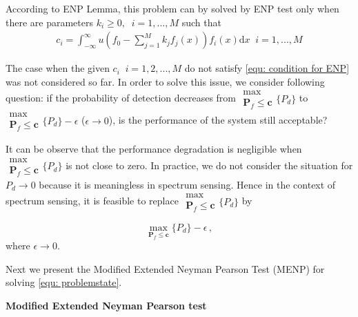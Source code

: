 \documentclass[12pt,journal,a4paper,twoside,onecolumn]{IEEEtran}
\begin{document}
\begin{spacing}{2.5}
According to ENP Lemma, this problem can by solved by ENP test only when there are parameters $k_i \geq 0, \;\;i=1, ..., M$ such that 
\begin{equation}
\label{equ: condition for ENP}
\begin{split}
c_i = \int_{-\infty}^{\infty}u(f_0 - \sum_{j=1}^{M}k_jf_j(x))f_i(x)\mathrm{d}x \;\;i = 1, ..., M
\end{split}
\end{equation}

The case when the given $c_i\;\;i = 1, 2, ..., M$ do not satisfy \eqref{equ: condition for ENP} was not considered so far. 
In order to solve this issue, we consider following question: if the probability of detection decreases from $\substack{\max \\ \mathbf{P}_f \leq \mathbf{c}}\{P_d\}$ to $\substack{\max \\ \mathbf{P}_f \leq \mathbf{c}}\{P_d\} - \epsilon$ ($\epsilon \rightarrow 0$), is the performance of the system still acceptable? 

It can be observe that the performance degradation is negligible when $\substack{\max \\ \mathbf{P}_f \leq \mathbf{c}}\{P_d\}$ is not close to zero. In practice, we do not consider the situation for $P_d \rightarrow 0$ because it is meaningless in spectrum sensing. Hence in the context of spectrum sensing, it is feasible to replace $\substack{\max \\ \mathbf{P}_f \leq \mathbf{c}}\{P_d\}$ by  

\begin{equation}
\label{equ: problemstate}
\max_{\mathbf{P}_{f} \leq \mathbf{c}}\{P_d\} - \epsilon\,,
\end{equation}
where  $\epsilon \rightarrow 0$. 

Next we present the Modified Extended Neyman Pearson Test (MENP) for solving \eqref{equ: problemstate}.

\noindent \textbf{Modified Extended Neyman Pearson test}


\end{spacing}
\end{document}
